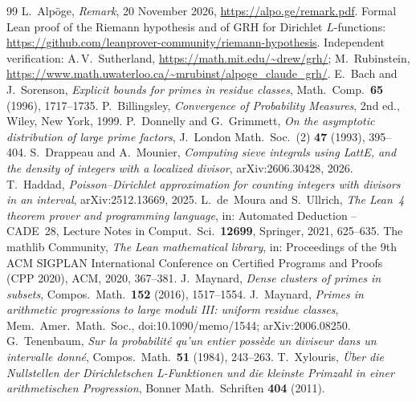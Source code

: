 \documentclass[11pt,colorlinks]{charlie}
\begin{document}
\begin{thebibliography}{99}\small
{} L.~Alp\"oge, \emph{Remark}, 20 November 2026, \url{https://alpo.ge/remark.pdf}. Formal Lean proof of the Riemann hypothesis and of GRH for Dirichlet $L$-functions: \url{https://github.com/leanprover-community/riemann-hypothesis}. Independent verification: A.\,V.~Sutherland, \url{https://math.mit.edu/~drew/grh/}; M.~Rubinstein, \url{https://www.math.uwaterloo.ca/~mrubinst/alpoge_claude_grh/}.
 E.~Bach and J.~Sorenson, \emph{Explicit bounds for primes in residue classes}, Math.\ Comp.\ \textbf{65} (1996), 1717--1735.
 P.~Billingsley, \emph{Convergence of Probability Measures}, 2nd ed., Wiley, New York, 1999.
 P.~Donnelly and G.~Grimmett, \emph{On the asymptotic distribution of large prime factors}, J.\ London Math.\ Soc.\ (2) \textbf{47} (1993), 395--404.
 S.~Drappeau and A.~Mounier, \emph{Computing sieve integrals using LattE, and the density of integers with a localized divisor}, arXiv:2606.30428, 2026.
 T.~Haddad, \emph{Poisson--Dirichlet approximation for counting integers with divisors in an interval}, arXiv:2512.13669, 2025.
 L.~de~Moura and S.~Ullrich, \emph{The Lean~4 theorem prover and programming language}, in: Automated Deduction -- CADE~28, Lecture Notes in Comput.\ Sci.\ \textbf{12699}, Springer, 2021, 625--635.
 The mathlib Community, \emph{The Lean mathematical library}, in: Proceedings of the 9th ACM SIGPLAN International Conference on Certified Programs and Proofs (CPP 2020), ACM, 2020, 367--381.
 J.~Maynard, \emph{Dense clusters of primes in subsets}, Compos.\ Math.\ \textbf{152} (2016), 1517--1554.
 J.~Maynard, \emph{Primes in arithmetic progressions to large moduli III: uniform residue classes}, Mem.\ Amer.\ Math.\ Soc., doi:10.1090/memo/1544; arXiv:2006.08250.
 G.~Tenenbaum, \emph{Sur la probabilit\'e qu'un entier poss\`ede un diviseur dans un intervalle donn\'e}, Compos.\ Math.\ \textbf{51} (1984), 243--263.
 T.~Xylouris, \emph{\"Uber die Nullstellen der Dirichletschen L-Funktionen und die kleinste Primzahl in einer arithmetischen Progression}, Bonner Math.\ Schriften \textbf{404} (2011).
\end{thebibliography}
\end{document}
